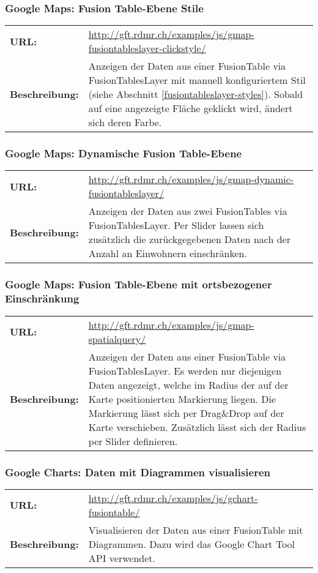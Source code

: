 \subsubsection{Google Maps: Fusion Table-Ebene Stile}
\begin{tabular}{p{0.2\twocelltabwidth}p{0.8\twocelltabwidth}}
\textbf{URL:} & \url{http://gft.rdmr.ch/examples/js/gmap-fusiontableslayer-clickstyle/} \\ 
\textbf{Beschreibung:} & Anzeigen der Daten aus einer FusionTable via FusionTablesLayer mit manuell konfiguriertem Stil (siehe Abschnitt \ref{fusiontableslayer-styles}). Sobald auf eine angezeigte Fläche geklickt wird, ändert sich deren Farbe. \\ 
\end{tabular} 

\subsubsection{Google Maps: Dynamische Fusion Table-Ebene}
\begin{tabular}{p{0.2\twocelltabwidth}p{0.8\twocelltabwidth}}
\textbf{URL:} & \url{http://gft.rdmr.ch/examples/js/gmap-dynamic-fusiontableslayer/} \\ 
\textbf{Beschreibung:} & Anzeigen der Daten aus zwei FusionTables via FusionTablesLayer. Per Slider lassen sich zusätzlich die zurückgegebenen Daten nach der Anzahl an Einwohnern einschränken.  \\ 
\end{tabular} 

\subsubsection{Google Maps: Fusion Table-Ebene mit ortsbezogener Einschränkung}
\begin{tabular}{p{0.2\twocelltabwidth}p{0.8\twocelltabwidth}}
\textbf{URL:} & \url{http://gft.rdmr.ch/examples/js/gmap-spatialquery/} \\ 
\textbf{Beschreibung:} & Anzeigen der Daten aus einer FusionTable via FusionTablesLayer. Es werden nur diejenigen Daten angezeigt, welche im Radius der auf der Karte positionierten Markierung liegen. Die Markierung lässt sich per Drag{\&}Drop auf der Karte verschieben. Zusätzlich lässt sich der Radius per Slider definieren. \\ 
\end{tabular} 

\subsubsection{Google Charts: Daten mit Diagrammen visualisieren}
\begin{tabular}{p{0.2\twocelltabwidth}p{0.8\twocelltabwidth}}
\textbf{URL:} & \url{http://gft.rdmr.ch/examples/js/gchart-fusiontable/} \\ 
\textbf{Beschreibung:} & Visualisieren der Daten aus einer FusionTable mit Diagrammen. Dazu wird das Google Chart Tool \gls{API} verwendet. \\ 
\end{tabular} 

